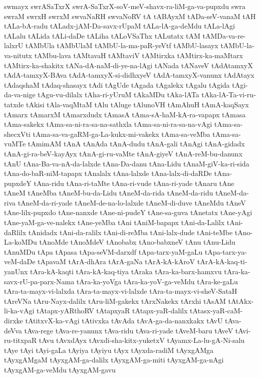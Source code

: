 {swmayx
swrASaTxrX
swrA-SaTxrX-soV-meV-shavx-ra-liM-ga-va-pupxdu
swra
swraM
swrxH
swrxM
swvaNaRH
swvaNoRV
tA
tABAyxM
tADa-seV-vanaM
tAH
tALa-bA-radu
tALadx-jAM-Da-savx-rUpaM
tALa-lA-ga-deMdu
tALa-lAgi
tALalu
tALida
tALi-daDe
tALiha
tALoVSaThx
tALutatx
tAM
tAMDa-va-re-lalxrU
tAMbUla
tAMbUlaM
tAMbU-la-ma-paR-yeVtf
tAMbU-lasayx
tAMbU-la-va-nitutx
tAMbu-lava
tAMtavaH
tAMtaviV
tAMtirxka
tAMtirx-ka-maMtarx
tAMtirx-ka-shakitx
tANa-dA-naM-di-ye-na-lAgi
tANada
tANaveV
tAdAtamxyX
tAdA-tamxyX-BAva
tAdA-tamxyX-si-didhxyeV
tAdA-tamxyX-vanunx
tAdAtayx
tAdaqshaM
tAdaq-shasayx
tAdi
tAgUde
tAgada
tAgalekx
tAgalu
tAgida
tAgi-da-va-nige
tAgu-vu-dilalx
tAha-ri-yUruM
tAkaMDu
tAka-lATa
tAka-lA-Ta-vi-ru-tatxde
tAkisi
tAla-vaqMtaM
tAlu
tAluge
tAlunoVH
tAmAhuH
tAmA-kaqSayx
tAmarx
tAmarxM
tAmarxdudx
tAmasA
tAma-sA-haM-kA-ra-vapapx
tAmasa
tAma-sakekx
tAma-sa-ni-ra-sa-na-sathxla
tAma-sa-ni-ra-sa-na-vAgi
tAma-sa-shecxVti
tAma-sa-va-gaRM-ga-La-kukx-mi-vakekx
tAma-sa-veMba
tAma-sa-vuMTe
tAmimAM
tAnA
tAnAda
tAnA-dudu
tAnA-gali
tAnAgi
tAnA-gidadx
tAnA-gi-ra-beV-kayAyx
tAnA-gi-ru-vaMte
tAnA-giyeV
tAnA-reM-bu-danunx
tAnU
tAna-Ba-va-nA-da-lalxde
tAna-Da-danu
tAna-Lidu
tAnaM-giV-ka-ri-sida
tAna-do-baR-niM-tapapx
tAnalalx
tAna-lalxde
tAna-lalx-di-daRDe
tAna-pupxdeY
tAna-ridu
tAna-ri-taMte
tAna-ri-vude
tAna-ri-yade
tAnaru
tAne
tAneM
tAneMba
tAneM-bu-da-Lidu
tAneM-da-rida
tAneM-da-ridu
tAneM-da-riva
tAneM-da-ri-yade
tAneM-de-na-lo-lalxde
tAneM-di-duve
tAneMdu
tAneV
tAne-lilx-pupxdo
tAne-nanxde
tAne-ni-pudeY
tAne-sa-guva
tAnetatx
tAne-yAgi
tAne-yaM-ga-ve-nalekx
tAne-yeMba
tAni
tAniM-bapapx
tAni-da-Lalilx
tAni-daRlilx
tAnidadx
tAni-da-ralilx
tAni-di-reMba
tAni-lalx-dude
tAni-teMbe
tAno-La-koMDu
tAnoMde
tAnoMdeV
tAnobabx
tAno-babxneV
tAnu
tAnu-Lidu
tAnuMDu
tApa
tApasa
tApa-seVM-darxdf
tApa-tarx-yaM-gaLu
tApa-tarx-ya-veM-daDe
tApavaM
tArA-dhAra
tArA-gaNa
tArA-kA-kAroV
tArA-kA-kaq-ti-yanUnx
tAra-kA-kaqti
tAra-kA-kaq-tiya
tAraka
tAra-ka-barx-hamxvu
tAra-ka-savx-rU-pa-parx-Nama
tAra-ka-yoVga
tAra-ka-yoV-ga-veMdu
tAra-ke-gaLu
tAra-ta-mayx-vi-lalxda
tAra-ta-mayx-vi-lalxde
tAra-ta-mayx-vi-sheV-SataH
tAreVNa
tAru-Nayx-dalilx
tAru-liM-gakekx
tArxNakekx
tArxhi
tAsAM
tAtAkx-li-ka-vAgi
tAtapx-yARthoRV
tAtapxyaR
tAtapx-yaR-dalilx
tAtasx-yaR-caM-dirxke
tAtitxvX-ka-vAgi
tAtivxka
tAvAda
tAvA-ga-da-nanxkakx
tAvU
tAva-deVva
tAva-rege
tAva-re-yanunx
tAva-ridu
tAva-ri-yade
tAveM-baru
tAveV
tAvi-ru-titxpaR
tAvu
tAvxdAyx
tAvxdi-sha-kitx-yuketxV
tAyamx-La-lu-gA-Ni-salu
tAye
tAyi
tAyi-gaLa
tAyiya
tAyiyu
tAyx
tAyxda-radiM
tAyxgAMga
tAyxgAMgaM
tAyxgAM-ga-dalilx
tAyxgAM-ga-miti
tAyxgAM-ga-nAgi
tAyxgAM-ga-veMdu
tAyxgAM-gavu
}
